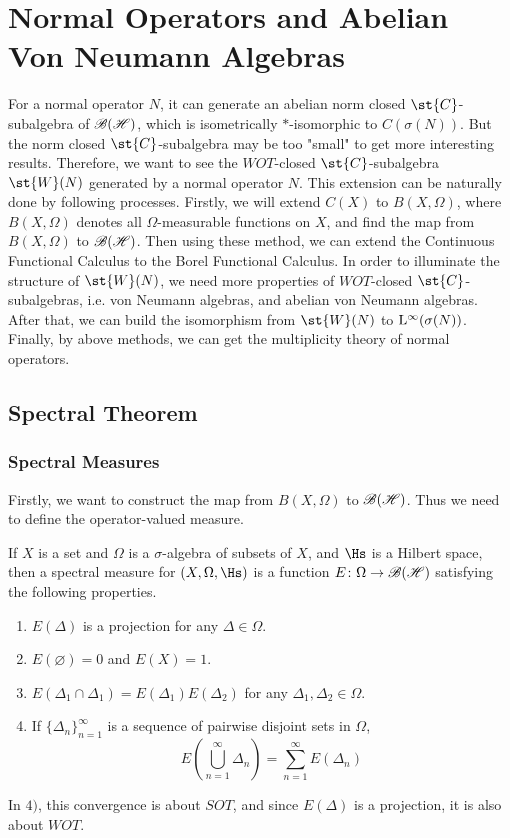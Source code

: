 \chapter{Normal Operators and Abelian Von Neumann Algebras}

For a normal operator $N$, it can generate an abelian norm closed $\st{C}$-subalgebra of $\mathscr{B(H)}$, which is isometrically $*$-isomorphic to $C(\sigma(N))$. But the norm closed $\st{C}$-subalgebra may be too "small" to get more interesting results. Therefore, we want to see the $WOT$-closed $\st{C}$-subalgebra $\st{W}(N)$ generated by a normal operator $N$. This extension can be naturally done by following processes. Firstly, we will extend $C(X)$ to $B(X,\Omega)$, where $B(X,\Omega)$ denotes all $\Omega$-measurable functions on $X$, and find the map from $B(X,\Omega)$ to $\mathscr{B(H)}$. Then using these method, we can extend the Continuous Functional Calculus to the Borel Functional Calculus. In order to illuminate the structure of $\st{W}(N)$, we need more properties of $WOT$-closed $\st{C}$-subalgebras, i.e. von Neumann algebras, and abelian von Neumann algebras. After that, we can build the isomorphism from $\st{W}(N)$ to $\mathrm{L^{\infty}}(\sigma(N))$. Finally, by above methods, we can get the multiplicity theory of normal operators.

\section{Spectral Theorem}

\subsection{Spectral Measures}

Firstly, we want to construct the map from $B(X,\Omega)$ to $\mathscr{B(H)}$. Thus we need to define the operator-valued measure.

\begin{defn}
	If $X$ is a set and $\Omega$ is a $\sigma$-algebra of subsets of $X$, and $\Hs$ is a Hilbert space, then a spectral measure for $(X,\Omega,\Hs)$ is a function $E \colon \Omega \rightarrow \mathscr{B(H)}$ satisfying the following properties.
	\begin{enumerate}[label=\arabic*)]
		\item $E(\Delta)$ is a projection for any $\Delta \in \Omega$.
		\item $E(\varnothing) = 0$ and $E(X) = 1$.
		\item $E(\Delta_1\cap\Delta_1)=E(\Delta_1)E(\Delta_2)$ for any $\Delta_1, \Delta_2 \in \Omega$.
		\item If $\{\Delta_n\}_{n=1}^{\infty}$ is a sequence of pairwise disjoint sets in $\Omega$,
		\begin{equation*}
			E(\bigcup_{n=1}^{\infty}\Delta_n) = \sum_{n=1}^{\infty} E(\Delta_n)
		\end{equation*}
	\end{enumerate}
\end{defn}
\begin{rem}
	In $4)$, this convergence is about $SOT$, and since $E(\Delta)$ is a projection, it is also about $WOT$.
\end{rem}

